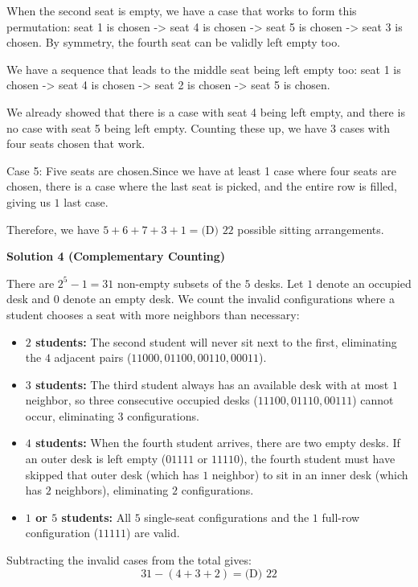 \begin{enumerate}
 When the second seat is empty, we have a case that works to form this permutation: seat 1 is chosen -> seat 4 is chosen -> seat 5 is chosen -> seat 3 is chosen.  By symmetry, the fourth seat can be validly left empty too.

 We have a sequence that leads to the middle seat being left empty too: seat 1 is chosen -> seat 4 is chosen -> seat 2 is chosen -> seat 5 is chosen.  

 We already showed that there is a case with seat 4 being left empty, and there is no case with seat 5 being left empty.  Counting these up, we have $\boxed{3}$ cases with four seats chosen that work.

 
Case 5: Five seats are chosen.Since we have at least 1 case where four seats are chosen, there is a case where the last seat is picked, and the entire row is filled, giving us $\boxed{1}$ last case.

 
Therefore, we have $5+6+7+3+1=\boxed{\text{(D) }{22}}$ possible sitting arrangements.

 



\textbf{Solution 4 (Complementary Counting)}

There are $2^5 - 1 = 31$ non-empty subsets of the $5$ desks. Let $1$ denote an occupied desk and $0$ denote an empty desk. We count the invalid configurations where a student chooses a seat with more neighbors than necessary:

 
            \begin{itemize}
        \item \textbf{$2$ students:} The second student will never sit next to the first, eliminating the $4$ adjacent pairs ($11000, 01100, 00110, 00011$).
        \item \textbf{$3$ students:} The third student always has an available desk with at most $1$ neighbor, so three consecutive occupied desks ($11100, 01110, 00111$) cannot occur, eliminating $3$ configurations.
        \item \textbf{$4$ students:} When the fourth student arrives, there are two empty desks. If an outer desk is left empty ($01111$ or $11110$), the fourth student must have skipped that outer desk (which has $1$ neighbor) to sit in an inner desk (which has $2$ neighbors), eliminating $2$ configurations.
        \item \textbf{$1$ or $5$ students:} All $5$ single-seat configurations and the $1$ full-row configuration ($11111$) are valid.
            \end{itemize}
            Subtracting the invalid cases from the total gives:
 \[31 - (4 + 3 + 2) = \boxed{\text{(D) }{22}}\]





\end{enumerate}
